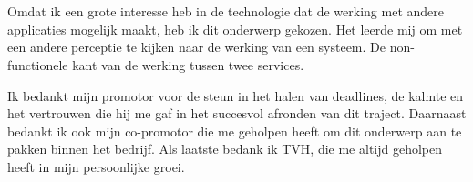 
\chapter*{}%
\label{ch:voorwoord}



Omdat ik een grote interesse heb in de technologie dat de werking met andere 
applicaties mogelijk maakt, heb ik dit onderwerp gekozen.
Het leerde mij om met een andere perceptie te kijken naar de werking van een systeem. De non-functionele kant van de werking tussen twee services.
\newline

Ik bedankt mijn promotor voor de steun in het halen van deadlines, 
de kalmte en het vertrouwen die hij me gaf in het succesvol afronden van dit traject.
Daarnaast bedankt ik ook mijn co-promotor die me geholpen heeft om dit onderwerp aan te pakken binnen het bedrijf.
Als laatste bedank ik TVH, die me altijd geholpen heeft in mijn persoonlijke groei.